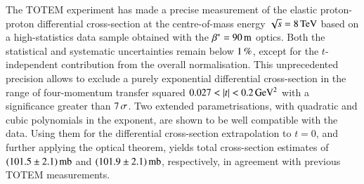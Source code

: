 The TOTEM experiment has made a precise measurement of the elastic 
proton-proton differential cross-section at the centre-of-mass energy 
$\sqrt s = 8\,{\rm TeV}$ based on a high-statistics data sample obtained with 
the $\beta^* = 90\,{\rm m}$ optics. 
Both the statistical and systematic uncertainties remain below $1\,{\rm \%}$, except for the $t$-independent contribution from the overall normalisation. This unprecedented precision allows to exclude a purely exponential differential cross-section in the range of four-momentum transfer squared $0.027 < |t| < 0.2\,{\rm GeV^2}$ with a significance greater than $7\,{\rm \sigma}$. Two extended parametrisations, with quadratic and cubic polynomials in the exponent, are shown to be well compatible with the data. Using them for the differential cross-section extrapolation to $t=0$, and further applying the optical theorem, yields total cross-section estimates of $(101.5 \pm 2.1)\,{\rm mb}$ and $(101.9 \pm 2.1)\,{\rm mb}$, respectively, in agreement with previous TOTEM measurements.

